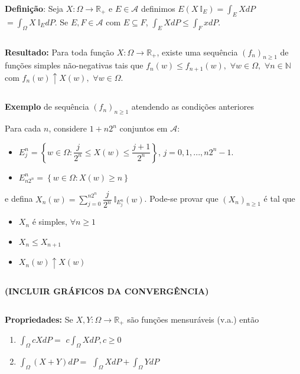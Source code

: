 \documentclass[
]{book}
\begin{document}
\(~\)

\textbf{Definição}: Seja \(X:\Omega \longrightarrow\mathbb{R}_+\) e \(E \in \mathcal{A}\) definimos \(E(X~\mathbb{I}_E) = \int_EXdP\) \(=\int_\Omega X~\mathbb{I}_EdP\). Se \(E,F \in \mathcal{A}\) com \(E\subseteq F\), \(\int_E XdP \leq \int_F xdP.\)

\(~\)

\textbf{Resultado:} Para toda função \(X:\Omega \longrightarrow \mathbb{R}_+\), existe uma sequência \((f_n)_{n\geq 1}\) de funções simples não-negativas tais que \(f_n(w)\leq f_{n+1}(w),\) \(\forall w \in \Omega,\) \(\forall n \in \mathbb{N}\) com \(f_n(w)\uparrow X(w),\) \(\forall w \in \Omega.\)

\(~\)

\textbf{Exemplo} de sequência \((f_n)_{n\geq 1}\) atendendo as condições anteriores

Para cada \(n\), considere \(1+n2^n\) conjuntos em \(\mathcal{A}:\)

\begin{itemize}
\item
  \(E_j^n = \left\{w \in \Omega: \dfrac{j}{2^n} \leq X(w) \leq \dfrac{j+1}{2^n} \right\}\), \(j = 0,1,...,n2^n-1.\)
\item
  \(E_{n2^n}^n = \left\{ w \in \Omega: X(w)\geq n \right\}\)
\end{itemize}

e defina \(X_n(w) = \sum_{j=0}^{n2^n} \dfrac{j}{2^n} ~\mathbb{I}_{E_j^n}(w)\). Pode-se provar que \((X_n)_{n\geq 1}\) é tal que

\begin{itemize}
\item
  \(X_n\) é simples, \(\forall n \geq 1\)
\item
  \(X_n \leq X_{n+1}\)
\item
  \(X_{n}(w) \uparrow X(w)\)
\end{itemize}

\(~\)

\textbf{(INCLUIR GRÁFICOS DA CONVERGÊNCIA)}

\(~\)

\textbf{Propriedades:} Se \(X, Y: \Omega \longrightarrow \mathbb{R}_+\) são funções mensuráveis (v.a.) então

\begin{enumerate}
\def\labelenumi{(\arabic{enumi})}
\item
  \(\int_\Omega cXdP =\) \(c\int_\Omega XdP, c\geq 0\)
\item
  \(\int_\Omega (X+Y)dP =\) \(\int_\Omega XdP + \int_\Omega YdP\)
\end{enumerate}
\end{document}
